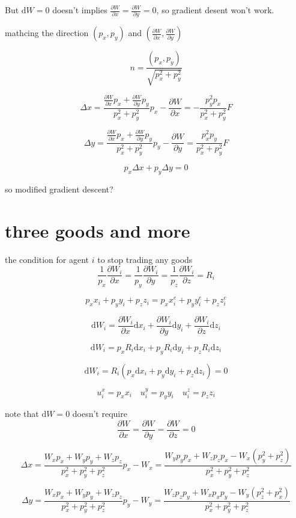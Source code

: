 \documentclass[12pt,a4paper]{article}
\begin{document}
But $\mathrm{d}W = 0$ doesn't implies $\frac{\partial W}{\partial x} = \frac{\partial W}{\partial y} = 0$, so gradient desent won't work.



mathcing the direction $(p_x,p_y)$ and $(\frac{\partial W}{\partial x} , \frac{\partial W}{\partial y})$

\[
n = \frac{(p_x,p_y)}{\sqrt{p_x^2 + p_y^2}}
\]

\[
\Delta x =\frac{\frac{\partial W}{\partial x}p_x+\frac{\partial W}{\partial y}p_y}{p_x^2 + p_y^2}p_x - \frac{\partial W}{\partial x}  = -\frac{p_y^2p_x}{p_x^2 + p_y^2}F
\]

\[
\Delta y = \frac{\frac{\partial W}{\partial x}p_x+\frac{\partial W}{\partial y}p_y}{p_x^2 + p_y^2}p_y - \frac{\partial W}{\partial y}  = \frac{p_x^2p_y}{p_x^2 + p_y^2}F
\]

\[
 p_x\Delta x + p_y\Delta y  = 0
\]

so modified gradient descent?

\section{three goods and more}
the condition for agent $i$ to stop trading any goods
\[
\frac{1}{p_x}\frac{\partial W_i}{\partial x}  = \frac{1}{p_y}\frac{\partial W_i}{\partial y}  = \frac{1}{p_z}\frac{\partial W_i}{\partial z} = R_i
\]

\[
p_xx_i+p_yy_i+p_zz_i = p_xx_i^e + p_yy_i^e+ p_zz_i^e
\]

\[
\mathrm{d}W_i = \frac{\partial W_i}{\partial x}\mathrm{d}x_i + \frac{\partial W_i}{\partial y}\mathrm{d}y_i + \frac{\partial W_i}{\partial z}\mathrm{d}z_i
\]

\[
\mathrm{d}W_i = p_xR_i\mathrm{d}x_i + p_yR_i\mathrm{d}y_i + p_zR_i\mathrm{d}z_i
\]

\[
\mathrm{d}W_i = R_i(p_x\mathrm{d}x_i + p_y\mathrm{d}y_i + p_z\mathrm{d}z_i)=0
\]


\[
u_i^x = p_xx_i \quad u_i^y = p_yy_i \quad u_i^z = p_zz_i
\]


note that $\mathrm{d}W = 0$ doesn't require
\[
\frac{\partial W}{\partial x} = \frac{\partial W}{\partial y} = \frac{\partial W}{\partial z} = 0
\]


\[
\Delta x =\frac{W_xp_x+W_yp_y+W_zp_z}{p_x^2+p_y^2+p_z^2}p_x - W_x = \frac{W_yp_yp_x+W_zp_zp_x-W_x(p_y^2+p_z^2)}{p_x^2+p_y^2+p_z^2}
\]

\[
\Delta y =\frac{W_xp_x+W_yp_y+W_zp_z}{p_x^2+p_y^2+p_z^2}p_y - W_y = \frac{W_zp_zp_y+W_xp_xp_y-W_y(p_z^2+p_x^2)}{p_x^2+p_y^2+p_z^2}
\]
\end{document}

